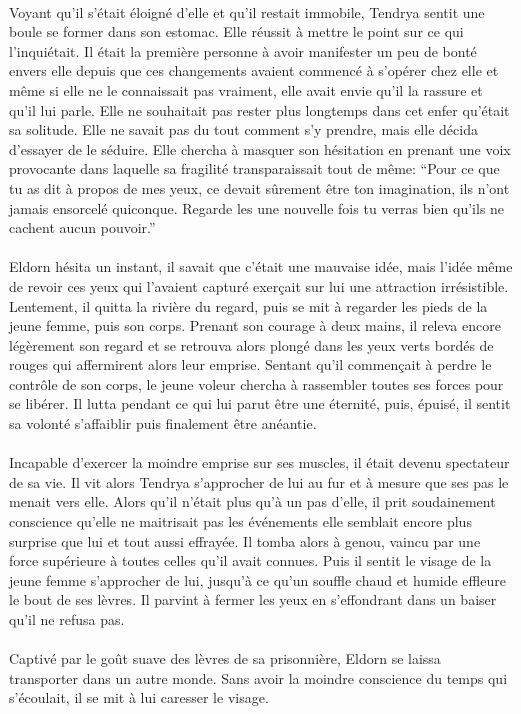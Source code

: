 \paragraph{}
Voyant qu'il s'était éloigné d'elle et qu'il restait immobile, Tendrya sentit
une boule se former dans son estomac. Elle réussit à mettre le point sur ce
qui l'inquiétait. Il était la première personne à avoir manifester un peu de
bonté envers elle depuis que ces changements avaient commencé à s'opérer chez
elle et même si elle ne le connaissait pas vraiment, elle avait envie qu'il la
rassure et qu'il lui parle. Elle ne souhaitait pas rester plus longtemps dans
cet enfer qu'était sa solitude. Elle ne savait pas du tout comment s'y
prendre, mais elle décida d'essayer de le séduire. Elle chercha à masquer son
hésitation en prenant une voix provocante dans laquelle sa fragilité
transparaissait tout de même: ``Pour ce que tu as dit à propos de mes yeux,
ce devait sûrement être ton imagination, ils n'ont jamais ensorcelé quiconque.
Regarde les une nouvelle fois tu verras bien qu'ils ne cachent aucun
pouvoir.''

\paragraph{}
Eldorn hésita un instant, il savait que c'était une mauvaise idée, mais l'idée
même de revoir ces yeux qui l'avaient capturé exerçait sur lui une attraction
irrésistible. Lentement, il quitta la rivière du regard, puis se mit à
regarder les pieds de la jeune femme, puis son corps.  Prenant
son courage à deux mains, il releva encore légèrement son regard et se
retrouva alors plongé dans les yeux verts bordés de rouges qui affermirent
alors leur emprise. Sentant qu'il commençait à perdre le contrôle de son
corps, le jeune voleur chercha à rassembler toutes ses forces pour se libérer.
Il lutta pendant ce qui lui parut être une éternité, puis, épuisé, il sentit
sa volonté s'affaiblir puis finalement être anéantie.

\paragraph{}
Incapable d'exercer la moindre emprise sur ses muscles, il était devenu
spectateur de sa vie. Il vit alors Tendrya s'approcher de lui au fur et à
mesure que ses pas le menait vers elle. Alors qu'il n'était plus qu'à un pas
d'elle, il prit soudainement conscience qu'elle ne maitrisait pas les
événements elle semblait encore plus surprise que lui et tout aussi effrayée.
Il tomba alors à genou, vaincu par une force supérieure à toutes celles qu'il
avait connues. Puis il sentit le visage de la jeune femme s'approcher de lui,
jusqu'à ce qu'un souffle chaud et humide effleure le bout de ses lèvres. Il
parvint à fermer les yeux en s'effondrant dans un baiser qu'il ne refusa pas.

\paragraph{}
Captivé par le goût suave des lèvres de sa prisonnière, Eldorn se laissa
transporter dans un autre monde. Sans avoir la moindre conscience du temps qui
s'écoulait, il se mit à lui caresser le visage.


